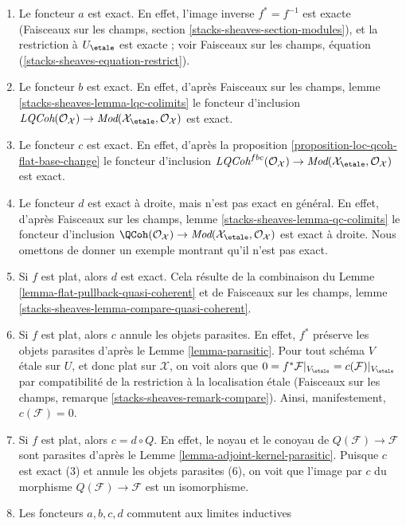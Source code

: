 \begin{enumerate}
\item Le foncteur $a$ est exact. En effet, l'image inverse $f^* = f^{-1}$ est exacte
(Faisceaux sur les champs, section \ref{stacks-sheaves-section-modules}),
et la restriction à $U_\etale$ est exacte ; voir
Faisceaux sur les champs, équation (\ref{stacks-sheaves-equation-restrict}).
\item Le foncteur $b$ est exact. En effet, d'après
Faisceaux sur les champs, lemme \ref{stacks-sheaves-lemma-lqc-colimits}
le foncteur d'inclusion $\textit{LQCoh}(\mathcal{O}_\mathcal{X}) \to
\textit{Mod}(\mathcal{X}_\etale, \mathcal{O}_\mathcal{X})$ est exact.
\item Le foncteur $c$ est exact. En effet, d'après la
proposition \ref{proposition-loc-qcoh-flat-base-change}
le foncteur d'inclusion $\textit{LQCoh}^{fbc}(\mathcal{O}_\mathcal{X}) \to
\textit{Mod}(\mathcal{X}_\etale, \mathcal{O}_\mathcal{X})$ est exact.
\item Le foncteur $d$ est exact à droite, mais n'est pas exact en général.
En effet, d'après Faisceaux sur les champs, lemme
\ref{stacks-sheaves-lemma-qc-colimits}
le foncteur d'inclusion $\QCoh(\mathcal{O}_\mathcal{X}) \to
\textit{Mod}(\mathcal{X}_\etale, \mathcal{O}_\mathcal{X})$ est exact à
droite. Nous omettons de donner un exemple montrant qu'il n'est pas exact.
\item Si $f$ est plat, alors $d$ est exact. Cela résulte de la combinaison du
Lemme \ref{lemma-flat-pullback-quasi-coherent} et de
Faisceaux sur les champs, lemme \ref{stacks-sheaves-lemma-compare-quasi-coherent}.
\item Si $f$ est plat, alors $c$ annule les objets parasites.
En effet, $f^*$ préserve les objets parasites d'après le Lemme \ref{lemma-parasitic}.
Pour tout schéma $V$ étale sur $U$, et donc plat sur $\mathcal{X}$,
on voit alors que
$0 = f^*\mathcal{F}|_{V_\etale} = c(\mathcal{F})|_{V_\etale}$
par compatibilité de la restriction à la localisation étale
(Faisceaux sur les champs, remarque \ref{stacks-sheaves-remark-compare}).
Ainsi, manifestement, $c(\mathcal{F}) = 0$.
\item Si $f$ est plat, alors $c = d \circ Q$. En effet, le noyau et le
conoyau de $Q(\mathcal{F}) \to \mathcal{F}$ sont parasites d'après le
Lemme \ref{lemma-adjoint-kernel-parasitic}. Puisque
$c$ est exact (3) et annule les objets parasites (6),
on voit que l'image par $c$ du morphisme $Q(\mathcal{F}) \to \mathcal{F}$
est un isomorphisme.
\item Les foncteurs $a, b, c, d$ commutent aux limites inductives

\end{enumerate}
